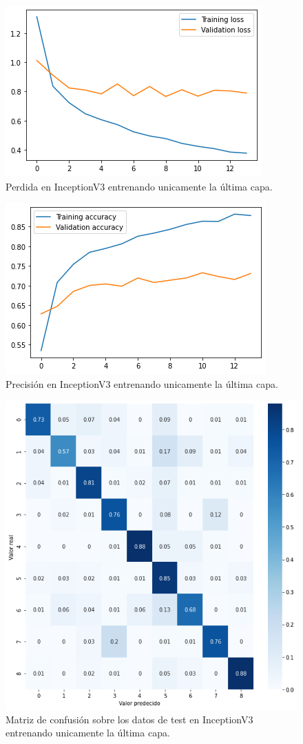 \begin{figure}[H]
  \centering
  \includegraphics[width=0.5\linewidth]{Imagenes/entrenamiento_redes/ult/inception_ult_loss.png}
  \caption{Perdida en InceptionV3 entrenando unicamente la última capa.}
\end{figure}

\begin{figure}[H]
  \centering
  \includegraphics[width=0.5\linewidth]{Imagenes/entrenamiento_redes/ult/inception_ult_acc.png}
  \caption{Precisión en InceptionV3 entrenando unicamente la última capa.}
\end{figure}

\begin{figure}[H]
  \centering
  \includegraphics[width=0.5\linewidth]{Imagenes/entrenamiento_redes/ult/inception_ult_matriz.png}
  \caption{Matriz de confusión sobre los datos de test en InceptionV3 entrenando unicamente la última capa.}
\end{figure}


